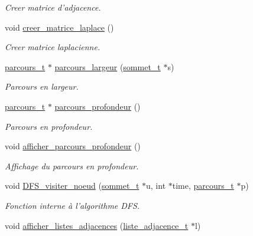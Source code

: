 \begin{DoxyCompactItemize}
\begin{DoxyCompactList}\small\item\em Creer matrice d'adjacence. \end{DoxyCompactList}\item 
\hypertarget{classGraphe_a01a623b6cfe3fcc38ef3ed0d3eb13226}{void \hyperlink{classGraphe_a01a623b6cfe3fcc38ef3ed0d3eb13226}{creer\+\_\+matrice\+\_\+laplace} ()}\label{classGraphe_a01a623b6cfe3fcc38ef3ed0d3eb13226}

\begin{DoxyCompactList}\small\item\em Creer matrice laplacienne. \end{DoxyCompactList}\item 
\hyperlink{structparcours__t}{parcours\+\_\+t} $\ast$ \hyperlink{classGraphe_ae824f4fe5eadd580272296b2e7cae561}{parcours\+\_\+largeur} (\hyperlink{structsommet}{sommet\+\_\+t} $\ast$s)
\begin{DoxyCompactList}\small\item\em Parcours en largeur. \end{DoxyCompactList}\item 
\hyperlink{structparcours__t}{parcours\+\_\+t} $\ast$ \hyperlink{classGraphe_a420e580d3803ee8ea7435ea7c15b2a91}{parcours\+\_\+profondeur} ()
\begin{DoxyCompactList}\small\item\em Parcours en profondeur. \end{DoxyCompactList}\item 
void \hyperlink{classGraphe_a8b6929c8f5869174c03f3ab2e4ec1fc8}{afficher\+\_\+parcours\+\_\+profondeur} ()
\begin{DoxyCompactList}\small\item\em Affichage du parcours en profondeur. \end{DoxyCompactList}\item 
void \hyperlink{classGraphe_a074adbc6a1f35fea18ede2a5be2ac767}{D\+F\+S\+\_\+visiter\+\_\+noeud} (\hyperlink{structsommet}{sommet\+\_\+t} $\ast$u, int $\ast$time, \hyperlink{structparcours__t}{parcours\+\_\+t} $\ast$p)
\begin{DoxyCompactList}\small\item\em Fonction interne à l'algorithme D\+F\+S. \end{DoxyCompactList}\item 
void \hyperlink{classGraphe_a0b150feac4a452b853ed6ed5be8d1c21}{afficher\+\_\+listes\+\_\+adjacences} (\hyperlink{structliste__adjacence__t}{liste\+\_\+adjacence\+\_\+t} $\ast$l)

\end{DoxyCompactItemize}
